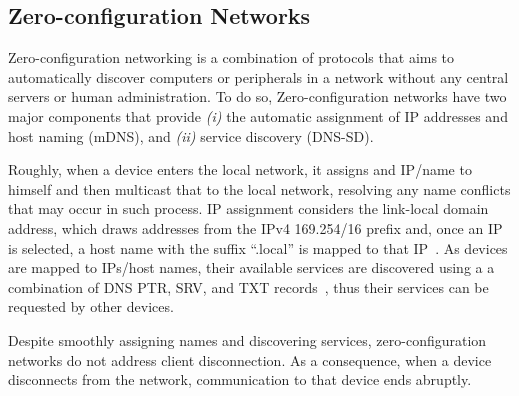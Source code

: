 \subsection{Zero-configuration Networks}
\label{sec:zeroconf}



Zero-configuration networking is a combination of protocols that aims to automatically discover computers or peripherals in a network without any central servers or human administration. To do so, Zero-configuration networks have two major components that provide {\it (i)} the automatic assignment of IP addresses and host naming (mDNS), and {\it (ii)} service discovery (DNS-SD).


Roughly, when a device enters the local network, it assigns and IP/name to himself and then multicast that to the local network, resolving any name conflicts that may occur in such process. IP assignment considers the link-local domain address, which draws addresses from the IPv4 169.254/16 prefix and, once an IP is selected, a host name with the suffix ``.local'' is mapped to that IP~\cite{rfc6762}. As devices are mapped to IPs/host names, their available services are discovered using a a combination of DNS PTR, SRV, and TXT records~\cite{rfc6763}, thus their services can be requested by other devices. 

Despite smoothly assigning names and discovering services, zero-configuration networks do not address client disconnection. As a consequence, when a device disconnects from the network, communication to that device ends abruptly. 


